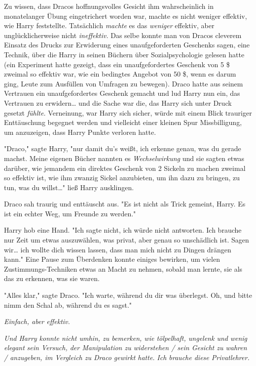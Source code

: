 {Zu wissen, dass Dracos hoffnungsvolles Gesicht ihm wahrscheinlich in monatelanger Übung eingetrichert worden war, machte es nicht weniger effektiv, wie Harry feststellte. Tatsächlich \emph{machte} es das \emph{weniger} effektiv, aber unglücklicherweise nicht \emph{ineffektiv.} Das selbe konnte man von Dracos cleverem Einsatz des Drucks zur Erwiderung eines unaufgeforderten Geschenks sagen, eine Technik, über die Harry in seinen Büchern über Sozialpsychologie gelesen hatte (ein Experiment hatte gezeigt, dass ein unaufgefordertes Geschenk von 5 \$ zweimal so effektiv war, wie ein bedingtes Angebot von 50 \$, wenn es darum ging, Leute zum Ausfüllen von Umfragen zu bewegen). Draco hatte aus seinem Vertrauen ein unaufgefordertes Geschenk gemacht und lud Harry nun ein, das Vertrauen zu erwidern… und die Sache war die, das Harry sich unter Druck gesetzt \emph{fühlte.} Verneinung, war Harry sich sicher, würde mit einem Blick trauriger Enttäuschung begegnet werden und vielleicht einer kleinen Spur Missbilligung, um anzuzeigen, dass Harry Punkte verloren hatte.

"Draco," sagte Harry, "nur damit du's weißt, ich erkenne genau, was du gerade machst. Meine eigenen Bücher nannten es \emph{Wechselwirkung} und sie sagten etwas darüber, wie jemandem ein direktes Geschenk von 2 Sickeln zu machen zweimal so effektiv ist, wie ihm zwanzig Sickel anzubieten, um ihn dazu zu bringen, zu tun, was du willst…" ließ Harry ausklingen.

Draco sah traurig und enttäuscht aus. "Es ist nicht als Trick gemeint, Harry. Es ist ein echter Weg, um Freunde zu werden."

Harry hob eine Hand. "Ich sagte nicht, ich würde nicht antworten. Ich brauche nur Zeit um etwas auszuwählen, was privat, aber genau so unschädlich ist. Sagen wir… ich wollte dich wissen lassen, dass man mich nicht zu Dingen drängen kann." Eine Pause zum Überdenken konnte einiges bewirken, um vielen Zustimmungs-Techniken etwas an Macht zu nehmen, sobald man lernte, sie als das zu erkennen, was sie waren.

"Alles klar," sagte Draco. "Ich warte, während du dir was überlegst. Oh, und bitte nimm den Schal ab, während du es sagst."

\emph{Einfach, aber effektiv.}

\emph{Und Harry konnte nicht umhin, zu bemerken, wie tölpelhaft, ungelenk und} \emph{wenig elegant} \emph{sein Versuch, der Manipulation zu widerstehen / sein Gesicht zu wahren / anzugeben, im Vergleich zu Draco gewirkt hatte.} \emph{\emph{Ich brauche diese Privatlehrer.}}

}
